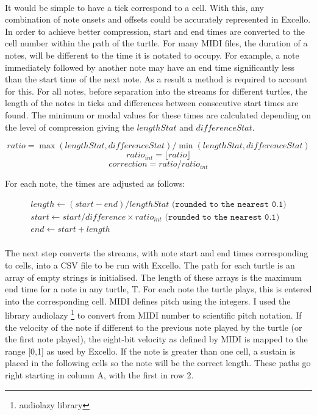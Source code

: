 \paragraph{} It would be simple to have a tick correspond to a cell. With this, any combination of note onsets and offsets could be accurately represented in Excello. In order to achieve better compression, start and end times are converted to the cell number within the path of the turtle. For many MIDI files, the duration of a notes, will be different to the time it is notated to occupy. For example, a note immediately followed by another note may have an end time significantly less than the start time of the next note. As a result a method is required to account for this. For all notes, before separation into the streams for different turtles, the length of the notes in ticks and differences between consecutive start times are found. The minimum or modal values for these times are calculated depending on the level of compression giving the $lengthStat$ and $differenceStat$.

  $$ratio = \max(lengthStat, differenceStat)/\min(lengthStat, differenceStat)$$
  $$ratio_{int} = \lfloor ratio \rfloor$$
  $$correction = ratio/ratio_{int}$$

For each note, the times are adjusted as follows:

\begin{align*}
  length \gets (start - end) / lengthStat \texttt{ (rounded to the nearest 0.1)} \\
  start \gets start / difference \times ratio_{int} \texttt{ (rounded to the nearest 0.1)}\\
  end \gets start +length
\end{align*}

\paragraph{} The next step converts the streams, with note start and end times corresponding to cells, into a CSV file to be run with Excello. The path for each turtle is an array of empty strings is initialised. The length of these arrays is the maximum end time for a note in any turtle, T.  For each note the turtle plays, this is entered into the corresponding cell. MIDI defines pitch using the integers. I used the library audiolazy \footnote{audiolazy library} to convert from MIDI number to scientific pitch notation. If the velocity of the note if different to the previous note played by the turtle (or the first note played), the eight-bit velocity as defined by MIDI is mapped to the range [0,1] as used by Excello. If the note is greater than one cell, a sustain is placed in the following cells so the note will be the correct length. These paths go right starting in column A, with the first in row 2.

